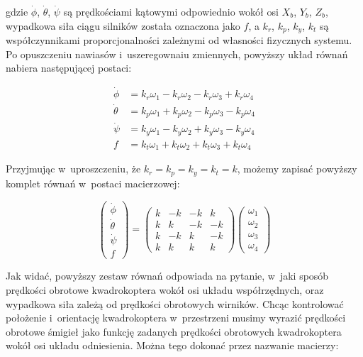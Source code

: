 gdzie $\dot{\phi}$, $\dot{\theta}$, $\dot{\psi}$ są prędkościami kątowymi odpowiednio wokół osi $X_b$, $Y_b$, $Z_b$, wypadkowa siła ciągu silników została oznaczona jako $f$, a $k_r$, $k_p$, $k_y$, $k_t$ są współczynnikami proporcjonalności zależnymi od własności fizycznych systemu. Po opuszczeniu nawiasów i~uszeregownaiu zmiennych, powyższy układ równań nabiera następującej postaci:

\begin{equation}
\begin{aligned}
	\dot{\phi} &= k_r\omega_1 - k_r\omega_2 - k_r\omega_3 + k_r\omega_4 \\
	\dot{\theta} &= k_p\omega_1 + k_p\omega_2 - k_p\omega_3 - k_p\omega_4 \\
	\dot{\psi} &= k_y\omega_1 - k_y\omega_2 + k_y\omega_3 - k_y\omega_4 \\
	f &= k_t\omega_1 + k_t\omega_2 + k_t\omega_3 + k_t\omega_4
\end{aligned}
\end{equation}



Przyjmując w~uproszczeniu, że $k_r = k_p = k_y = k_t = k$, możemy zapisać powyższy komplet równań w~postaci macierzowej:

\begin{equation}
	\label{eq:omega_as_argument}
	\begin{pmatrix}
		\dot{\phi} \\
		\dot{\theta} \\
		\dot{\psi} \\
		f
	\end{pmatrix} = 
	\begin{pmatrix}
		k & -k & -k & k \\
		k & k & -k & -k \\
		k & -k & k & -k \\
		k & k & k & k
	\end{pmatrix}
	\begin{pmatrix}
		\omega_1 \\
		\omega_2 \\
		\omega_3 \\
		\omega_4
	\end{pmatrix}
\end{equation}

Jak widać, powyższy zestaw równań odpowiada na pytanie, w~jaki sposób prędkości obrotowe kwadrokoptera wokół osi układu współrzędnych, oraz wypadkowa siła zależą od prędkości obrotowych wirników. Chcąc kontrolować położenie i~orientację kwadrokoptera w~przestrzeni musimy wyrazić prędkości obrotowe śmigieł jako funkcję zadanych prędkości obrotowych kwadrokoptera wokół osi układu odniesienia. Można tego dokonać przez nazwanie macierzy:

